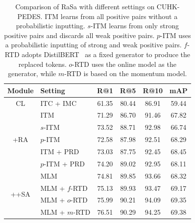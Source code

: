 \documentclass{article}
\begin{document}
\begin{table}[tp]
\small
\renewcommand\arraystretch{1.2}
\setlength{\tabcolsep}{5pt}
\centering
\begin{tabular}{c|l|cccc} 
\hline
Module              & Setting         & R@1            & R@5            & R@10           & mAP             \\ 
\hline
CL                  & ITC + IMC         & 61.35          & 80.44          & 86.91          & 59.44           \\ 
\hline
\multirow{5}{*}{+RA} & ITM            & 71.29          & 86.70          & 91.46          & 67.82           \\
                    & $s$-ITM          & 73.52          & 88.71          & 92.98          & 66.74           \\
                    & $p$-ITM          & 72.58          & 87.98          & 92.51          & 68.29           \\
                    & ITM + PRD        & 73.03          & 87.75          & 92.45          & 68.45           \\
                    & $p$-ITM + PRD      & 74.20          & 89.02          & 92.95          & 68.11           \\ 
\hline
\multirow{4}{*}{++SA} & MLM         & 74.81          & 89.85          & 93.66          & 68.32           \\
                    & MLM + $f$-RTD & 75.13          & 89.93          & 93.47          & 69.17           \\
                    & MLM + $o$-RTD & 75.99          & 90.21          & 94.09          & 69.35           \\
                    & MLM + $m$-RTD & 76.51          & 90.29          & 94.25          & 69.38  \\
\hline
\end{tabular}
\caption{Comparison of RaSa with different settings on CUHK-PEDES. ITM learns from all positive pairs without a probabilistic inputting. $s$-ITM learns from only strong positive pairs and discards all weak positive pairs. $p$-ITM uses a probabilistic inputting of strong and weak positive pairs. $f$-RTD adopts DistilBERT~\protect\cite{sanh2019distilbert} as a fixed generator to produce the replaced tokens. $o$-RTD uses the online model as the generator, while $m$-RTD is based on the momentum model.}
\label{table4}
\end{table}
\end{document}
